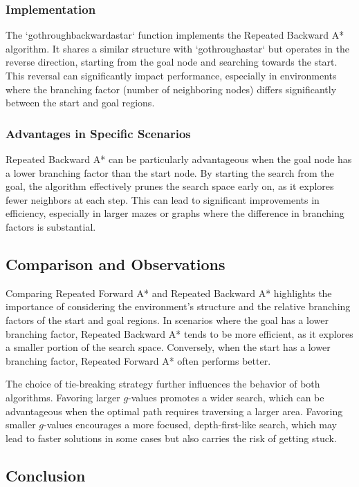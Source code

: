 \documentclass[12pt]{article}
\begin{document}
\subsubsection{Implementation}

The `gothroughbackwardastar` function implements the Repeated Backward A* algorithm. It shares a similar structure with `gothroughastar` but operates in the reverse direction, starting from the goal node and searching towards the start. This reversal can significantly impact performance, especially in environments where the branching factor (number of neighboring nodes) differs significantly between the start and goal regions.

\subsubsection{Advantages in Specific Scenarios}

Repeated Backward A* can be particularly advantageous when the goal node has a lower branching factor than the start node. By starting the search from the goal, the algorithm effectively prunes the search space early on, as it explores fewer neighbors at each step. This can lead to significant improvements in efficiency, especially in larger mazes or graphs where the difference in branching factors is substantial.

\subsection{Comparison and Observations}

Comparing Repeated Forward A* and Repeated Backward A* highlights the importance of considering the environment's structure and the relative branching factors of the start and goal regions. In scenarios where the goal has a lower branching factor, Repeated Backward A* tends to be more efficient, as it explores a smaller portion of the search space. Conversely, when the start has a lower branching factor, Repeated Forward A* often performs better.

The choice of tie-breaking strategy further influences the behavior of both algorithms. Favoring larger $g$-values promotes a wider search, which can be advantageous when the optimal path requires traversing a larger area. Favoring smaller $g$-values encourages a more focused, depth-first-like search, which may lead to faster solutions in some cases but also carries the risk of getting stuck.

\subsection{Conclusion}
\end{document}
